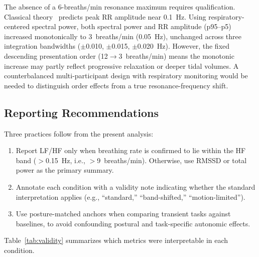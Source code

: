 \documentclass[conference]{IEEEtran}
\begin{document}
The absence of a 6-breaths/min resonance maximum requires
qualification. Classical theory~\cite{lehrer2014} predicts peak RR
amplitude near 0.1~Hz. Using respiratory-centered spectral power,
both spectral power and RR amplitude (p95--p5) increased
monotonically to 3~breaths/min (0.05~Hz), unchanged across three
integration bandwidths ($\pm$0.010, $\pm$0.015, $\pm$0.020~Hz).
However, the fixed descending presentation order
(12$\to$3~breaths/min) means the monotonic increase may partly
reflect progressive relaxation or deeper tidal volumes.
A counterbalanced multi-participant design with respiratory
monitoring would be needed to distinguish order effects from a true
resonance-frequency shift.

\subsection{Reporting Recommendations}

Three practices follow from the present analysis:
\begin{enumerate}
\item Report LF/HF only when breathing rate is confirmed to lie
  within the HF band ($>$0.15~Hz, i.e., $>$9~breaths/min).
  Otherwise, use RMSSD or total power as the primary summary.
\item Annotate each condition with a validity note indicating
  whether the standard interpretation applies (e.g.,
  ``standard,'' ``band-shifted,'' ``motion-limited'').
\item Use posture-matched anchors when comparing transient tasks
  against baselines, to avoid confounding postural and
  task-specific autonomic effects.
\end{enumerate}

Table~\ref{tab:validity} summarizes which metrics were interpretable
in each condition.
\end{document}
